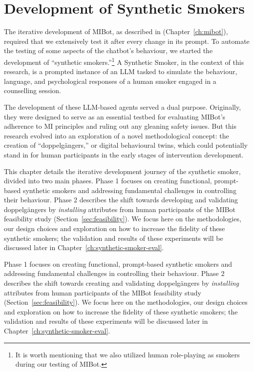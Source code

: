 \chapter{Development of Synthetic Smokers}
\label{ch:synthetic-smoker}

The iterative development of MIBot, as described in (Chapter~\ref{ch:mibot}), required that we extensively test it after every change in its prompt. To automate the testing of some aspects of the chatbot's behaviour, we started the development of ``synthetic smokers.''\footnote{It is worth mentioning that we also utilized human role-playing as smokers during our testing of MIBot.} A Synthetic Smoker, in the context of this research, is a prompted instance of an LLM tasked to simulate the behaviour, language, and psychological responses of a human smoker engaged in a counselling session.

The development of these LLM-based agents served a dual purpose. Originally, they were designed to serve as an essential testbed for evaluating MIBot's adherence to MI principles and ruling out any gleaning safety issues. But this research evolved into an exploration of a novel methodological concept: the creation of ``doppelgängers,'' or digital behavioural twins, which could potentially stand in for human participants in the early stages of intervention development.

This chapter details the iterative development journey of the synthetic smoker, divided into two main phases. Phase 1 focuses on creating functional, prompt-based synthetic smokers and addressing fundamental challenges in controlling their behaviour. Phase 2 describes the shift towards developing and validating doppelgängers by \emph{installing} attributes from human participants of the MIBot feasibility study (Section~\ref{sec:feasibility}). We focus here on the methodologies, our design choices and exploration on how to increase the fidelity of these synthetic smokers; the validation and results of these experiments will be discussed later in Chapter~\ref{ch:synthetic-smoker-eval}.


Phase 1 focuses on creating functional, prompt-based synthetic smokers and addressing fundamental challenges in controlling their behaviour. Phase 2 describes the shift towards creating and validating doppelgängers by \emph{installing} attributes from human participants of the MIBot feasibility study (Section~\ref{sec:feasibility}). We focus here on the methodologies, our design choices and exploration on how to increase the fidelity of these synthetic smokers; the validation and results of these experiments will be discussed later in Chapter~\ref{ch:synthetic-smoker-eval}.

